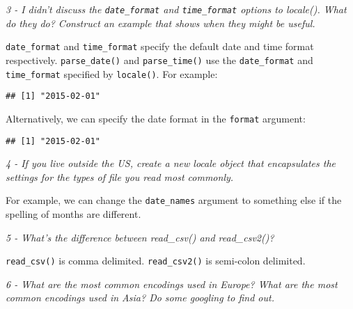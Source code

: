\documentclass[]{article}
\newenvironment{Shaded}{\begin{snugshade}}{\end{snugshade}}
\newcommand{\KeywordTok}[1]{\textcolor[rgb]{0.13,0.29,0.53}{\textbf{#1}}}
\newcommand{\DataTypeTok}[1]{\textcolor[rgb]{0.13,0.29,0.53}{#1}}
\newcommand{\StringTok}[1]{\textcolor[rgb]{0.31,0.60,0.02}{#1}}
\newcommand{\NormalTok}[1]{#1}
\theoremstyle{definition}
\theoremstyle{definition}
\theoremstyle{definition}
\theoremstyle{remark}
\begin{document}
\emph{3 - I didn't discuss the \texttt{date\_format} and
\texttt{time\_format} options to locale(). What do they do? Construct an
example that shows when they might be useful.}

\texttt{date\_format} and \texttt{time\_format} specify the default date
and time format respectively. \texttt{parse\_date()} and
\texttt{parse\_time()} use the \texttt{date\_format} and
\texttt{time\_format} specified by \texttt{locale()}. For example:

\begin{Shaded}
\end{Shaded}

\begin{verbatim}
## [1] "2015-02-01"
\end{verbatim}

Alternatively, we can specify the date format in the \texttt{format}
argument:

\begin{Shaded}
\end{Shaded}

\begin{verbatim}
## [1] "2015-02-01"
\end{verbatim}

\emph{4 - If you live outside the US, create a new locale object that
encapsulates the settings for the types of file you read most commonly.}

For example, we can change the \texttt{date\_names} argument to
something else if the spelling of months are different.

\emph{5 - What's the difference between read\_csv() and read\_csv2()?}

\texttt{read\_csv()} is comma delimited. \texttt{read\_csv2()} is
semi-colon delimited.

\emph{6 - What are the most common encodings used in Europe? What are
the most common encodings used in Asia? Do some googling to find out.}
\end{document}
